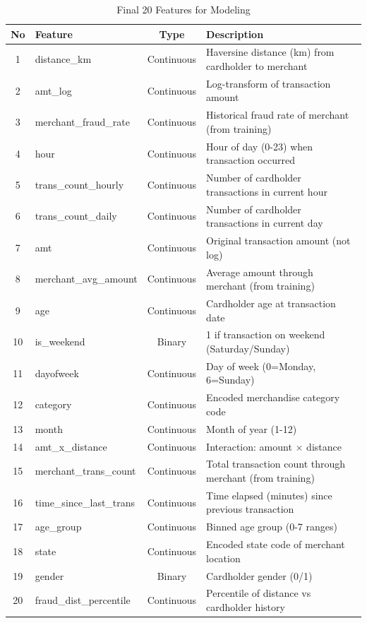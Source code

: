 \begin{table}[H]
\centering
\caption{Final 20 Features for Modeling}
\small
\begin{tabular}{|c|l|c|l|}
\hline
\textbf{No} & \textbf{Feature} & \textbf{Type} & \textbf{Description} \\
\hline
1 & distance\_km & Continuous & Haversine distance (km) from cardholder to merchant \\
\hline
2 & amt\_log & Continuous & Log-transform of transaction amount \\
\hline
3 & merchant\_fraud\_rate & Continuous & Historical fraud rate of merchant (from training) \\
\hline
4 & hour & Continuous & Hour of day (0-23) when transaction occurred \\
\hline
5 & trans\_count\_hourly & Continuous & Number of cardholder transactions in current hour \\
\hline
6 & trans\_count\_daily & Continuous & Number of cardholder transactions in current day \\
\hline
7 & amt & Continuous & Original transaction amount (not log) \\
\hline
8 & merchant\_avg\_amount & Continuous & Average amount through merchant (from training) \\
\hline
9 & age & Continuous & Cardholder age at transaction date \\
\hline
10 & is\_weekend & Binary & 1 if transaction on weekend (Saturday/Sunday) \\
\hline
11 & dayofweek & Continuous & Day of week (0=Monday, 6=Sunday) \\
\hline
12 & category & Continuous & Encoded merchandise category code \\
\hline
13 & month & Continuous & Month of year (1-12) \\
\hline
14 & amt\_x\_distance & Continuous & Interaction: amount $\times$ distance \\
\hline
15 & merchant\_trans\_count & Continuous & Total transaction count through merchant (from training) \\
\hline
16 & time\_since\_last\_trans & Continuous & Time elapsed (minutes) since previous transaction \\
\hline
17 & age\_group & Continuous & Binned age group (0-7 ranges) \\
\hline
18 & state & Continuous & Encoded state code of merchant location \\
\hline
19 & gender & Binary & Cardholder gender (0/1) \\
\hline
20 & fraud\_dist\_percentile & Continuous & Percentile of distance vs cardholder history \\
\hline
\end{tabular}
\end{table}

